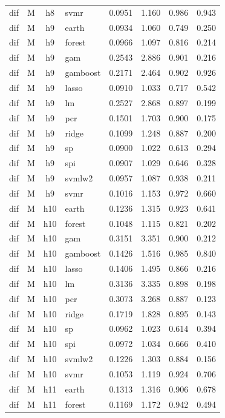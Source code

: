 \begin{ThreePartTable}
\begin{longtable}[t]{llclcccc}
dif & M & h8 & svmr & 0.0951 & 1.160 & 0.986 & 0.943\\
\addlinespace
dif & M & h9 & earth & 0.0934 & 1.060 & 0.749 & 0.250\\
dif & M & h9 & forest & 0.0966 & 1.097 & 0.816 & 0.214\\
dif & M & h9 & gam & 0.2543 & 2.886 & 0.901 & 0.216\\
dif & M & h9 & gamboost & 0.2171 & 2.464 & 0.902 & 0.926\\
dif & M & h9 & lasso & 0.0910 & 1.033 & 0.717 & 0.542\\
dif & M & h9 & lm & 0.2527 & 2.868 & 0.897 & 0.199\\
dif & M & h9 & pcr & 0.1501 & 1.703 & 0.900 & 0.175\\
dif & M & h9 & ridge & 0.1099 & 1.248 & 0.887 & 0.200\\
dif & M & h9 & sp & 0.0900 & 1.022 & 0.613 & 0.294\\
dif & M & h9 & spi & 0.0907 & 1.029 & 0.646 & 0.328\\
dif & M & h9 & svmlw2 & 0.0957 & 1.087 & 0.938 & 0.211\\
dif & M & h9 & svmr & 0.1016 & 1.153 & 0.972 & 0.660\\
\addlinespace
dif & M & h10 & earth & 0.1236 & 1.315 & 0.923 & 0.641\\
dif & M & h10 & forest & 0.1048 & 1.115 & 0.821 & 0.202\\
dif & M & h10 & gam & 0.3151 & 3.351 & 0.900 & 0.212\\
dif & M & h10 & gamboost & 0.1426 & 1.516 & 0.985 & 0.840\\
dif & M & h10 & lasso & 0.1406 & 1.495 & 0.866 & 0.216\\
dif & M & h10 & lm & 0.3136 & 3.335 & 0.898 & 0.198\\
dif & M & h10 & pcr & 0.3073 & 3.268 & 0.887 & 0.123\\
dif & M & h10 & ridge & 0.1719 & 1.828 & 0.895 & 0.143\\
dif & M & h10 & sp & 0.0962 & 1.023 & 0.614 & 0.394\\
dif & M & h10 & spi & 0.0972 & 1.034 & 0.666 & 0.410\\
dif & M & h10 & svmlw2 & 0.1226 & 1.303 & 0.884 & 0.156\\
dif & M & h10 & svmr & 0.1053 & 1.119 & 0.924 & 0.706\\
\addlinespace
dif & M & h11 & earth & 0.1313 & 1.316 & 0.906 & 0.678\\
dif & M & h11 & forest & 0.1169 & 1.172 & 0.942 & 0.494\\

\end{longtable}
\end{ThreePartTable}
